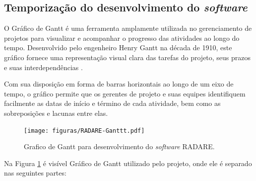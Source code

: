 \subsection{Temporização do desenvolvimento do \textit{software}}

O Gráfico de Gantt é uma ferramenta amplamente utilizada no gerenciamento de projetos para visualizar e acompanhar o progresso das atividades ao longo do tempo. Desenvolvido pelo engenheiro Henry Gantt na década de 1910, este gráfico fornece uma representação visual clara das tarefas do projeto, seus prazos e suas interdependências \cite{ganttchart}. 

Com sua disposição em forma de barras horizontais ao longo de um eixo de tempo, o gráfico permite que os gerentes de projeto e suas equipes identifiquem facilmente as datas de início e término de cada atividade, bem como as sobreposições e lacunas entre elas.
    
\begin{figure}[h]
    \centering
    \texttt{[image: figuras/RADARE-Ganttt.pdf]} %
    \caption{Grafico de Gantt para desenvolvimento do \textit{software} RADARE.}
    \label{fig:ganttChart}
\end{figure}    

Na Figura \ref{fig:ganttChart} é visível Gráfico de Gantt utilizado pelo projeto, onde ele é separado nas seguintes partes: 
    
